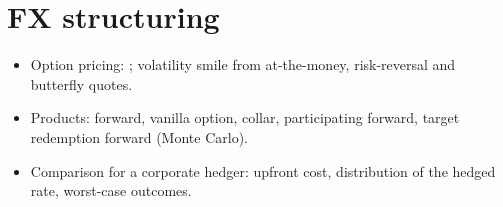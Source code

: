 \section{FX structuring}\label{sec:structuring}


\begin{itemize}
  \item Option pricing: \citet{garman1983}; volatility smile from at-the-money, risk-reversal and butterfly quotes.
  \item Products: forward, vanilla option, collar, participating forward, target redemption forward (Monte Carlo).
  \item Comparison for a corporate hedger: upfront cost, distribution of the hedged rate, worst-case outcomes.
\end{itemize}
